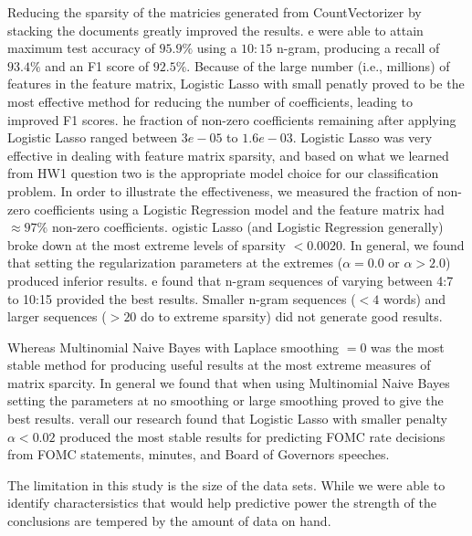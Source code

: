 \documentclass[11pt]{article}
\newcommand{\vertSpace}[1]{\vspace{3mm}}
\begin{document}
{\vertSpace

\section{Conclusion}
Reducing the sparsity of the matricies generated from CountVectorizer by stacking the documents greatly improved the results.  \vertSpace


We were able to attain maximum test accuracy of $95.9\%$ using a $10:15$ n-gram, producing a recall of $93.4\%$ and an F1 score of $92.5\%$.  Because of the large number (i.e., millions) of features in the feature matrix, Logistic Lasso with small penatly proved to be the most effective method for reducing the number of coefficients, leading to improved F1 scores.  \vertSpace


The fraction of non-zero coefficients remaining after applying Logistic Lasso ranged between $3e-05$ to $1.6e-03$.  Logistic Lasso was very effective in dealing with feature matrix sparsity, and based on what we learned from HW1 question two is the appropriate model choice for our classification problem.  In order to illustrate the effectiveness, we measured the fraction of non-zero coefficients using a Logistic Regression model and the feature matrix had $\approx 97\%$ non-zero coefficients.  \vertSpace 


Logistic Lasso (and Logistic Regression generally) broke down at the most extreme levels of sparsity $<0.0020$.  In general, we found that setting the regularization parameters at the extremes ($\alpha=0.0$ or $\alpha > 2.0$) produced inferior results.  \vertSpace 

We found that n-gram sequences of varying between 4:7 to 10:15 provided the best results. Smaller n-gram sequences ($< 4$ words) and larger sequences ($>20$ do to extreme sparsity) did not generate good results.

Whereas Multinomial Naive Bayes with Laplace smoothing $=0$ was the most stable method for producing useful results at the most extreme measures of matrix sparcity.  In general we found that when using Multinomial Naive Bayes setting the parameters at no smoothing or large smoothing proved to give the best results. \vertSpace  


Overall our research found that Logistic Lasso with smaller penalty $\alpha < 0.02$ produced the most stable results for predicting FOMC rate decisions from FOMC statements, minutes, and Board of Governors speeches.

The limitation in this study is the size of the data sets. While we were able to identify charactersistics that would help predictive power the strength of the conclusions are tempered by the amount of data on hand.


}
\end{document}
